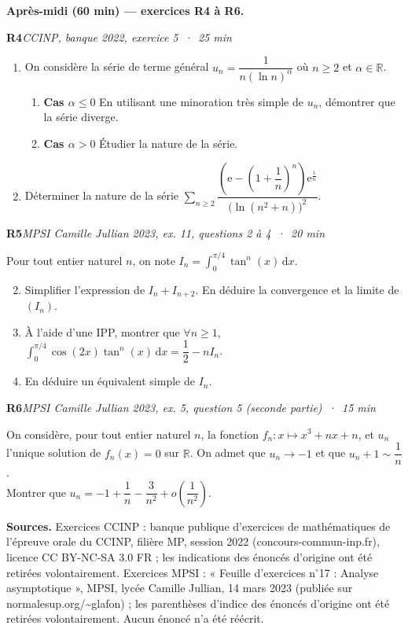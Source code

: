 \documentclass[11pt,a4paper]{article}
\newcommand{\R}{\mathbb{R}}
\newcommand{\ee}{\mathrm{e}}
\newcommand{\dd}{\,\mathrm{d}}
\newcommand{\exo}[3]{\vspace{1.1em}\noindent\textbf{\large #1}\hfill\textit{#2 \,·\, #3}\par\smallskip}
\begin{document}
\newpage
\noindent\textbf{Après-midi (60 min) --- exercices R4 à R6.}

\exo{R4}{CCINP, banque 2022, exercice 5}{25 min}
\begin{enumerate}
\item On considère la série de terme général $u_n=\dfrac{1}{n(\ln n)^{\alpha}}$ où $n\geqslant 2$ et $\alpha\in\R$.
 \begin{enumerate}
 \item \textbf{Cas $\alpha\leqslant 0$} \quad En utilisant une minoration très simple de $u_n$, démontrer que la série diverge.
 \item \textbf{Cas $\alpha>0$} \quad Étudier la nature de la série.
 \end{enumerate}
\item Déterminer la nature de la série $\displaystyle\sum_{n\geqslant 2}\dfrac{\left(\ee-\left(1+\dfrac1n\right)^{n}\right)\ee^{\frac1n}}{\big(\ln(n^2+n)\big)^2}$.
\end{enumerate}

\exo{R5}{MPSI Camille Jullian 2023, ex. 11, questions 2 à 4}{20 min}
\noindent Pour tout entier naturel $n$, on note $I_n=\displaystyle\int_0^{\pi/4}\tan^n(x)\dd x$.
\begin{enumerate}
\setcounter{enumi}{1}
\item Simplifier l'expression de $I_n+I_{n+2}$. En déduire la convergence et la limite de $(I_n)$.
\item À l'aide d'une IPP, montrer que $\forall n\geqslant 1$, $\displaystyle\int_0^{\pi/4}\cos(2x)\tan^n(x)\dd x=\dfrac12-nI_n$.
\item En déduire un équivalent simple de $I_n$.
\end{enumerate}

\exo{R6}{MPSI Camille Jullian 2023, ex. 5, question 5 (seconde partie)}{15 min}
\noindent On considère, pour tout entier naturel $n$, la fonction $f_n : x\mapsto x^3+nx+n$, et $u_n$ l'unique solution de $f_n(x)=0$ sur $\R$. On admet que $u_n\to-1$ et que $u_n+1\sim\dfrac1n$.\\
Montrer que $u_n=-1+\dfrac1n-\dfrac{3}{n^2}+o\!\left(\dfrac1{n^2}\right)$.

\vfill
\begin{small}
\noindent\textbf{Sources.} Exercices CCINP : banque publique d'exercices de mathématiques de l'épreuve orale du CCINP, filière MP, session 2022 (concours-commun-inp.fr), licence CC BY-NC-SA 3.0 FR ; les indications des énoncés d'origine ont été retirées volontairement. Exercices MPSI : « Feuille d'exercices n$^{\circ}$17 : Analyse asymptotique », MPSI, lycée Camille Jullian, 14 mars 2023 (publiée sur normalesup.org/\textasciitilde glafon) ; les parenthèses d'indice des énoncés d'origine ont été retirées volontairement. Aucun énoncé n'a été réécrit.
\end{small}
\end{document}
